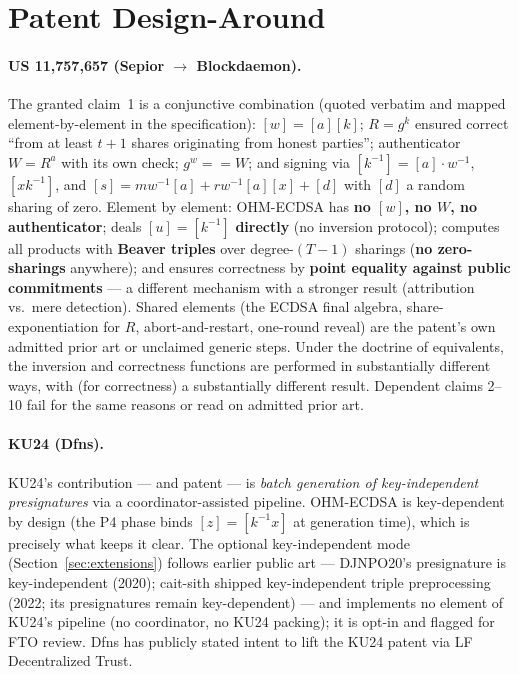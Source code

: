 \documentclass[11pt]{article}
\theoremstyle{plain}
\theoremstyle{definition}
\theoremstyle{remark}
\newcommand{\share}[1]{[#1]}
\begin{document}
\section{Patent Design-Around}\label{sec:patent}

\paragraph{US 11,757,657 (Sepior $\to$ Blockdaemon).} The granted claim~1 is a conjunctive combination (quoted verbatim and mapped element-by-element in the specification): $\share{w} = \share{a}\share{k}$; $R = g^k$ ensured correct ``from at least $t{+}1$ shares originating from honest parties''; authenticator $W = R^a$ with its own check; $g^w == W$; and signing via $\share{k^{-1}} = \share{a}\cdot w^{-1}$, $\share{x k^{-1}}$, and $\share{s} = m w^{-1}\share{a} + r w^{-1}\share{a}\share{x} + \share{d}$ with $\share{d}$ a random sharing of zero. Element by element: OHM-ECDSA has \textbf{no $\share{w}$, no $W$, no authenticator}; deals $\share{u} = \share{k^{-1}}$ \textbf{directly} (no inversion protocol); computes all products with \textbf{Beaver triples} over degree-$(T{-}1)$ sharings (\textbf{no zero-sharings} anywhere); and ensures correctness by \textbf{point equality against public commitments} --- a different mechanism with a stronger result (attribution vs.\ mere detection). Shared elements (the ECDSA final algebra, share-exponentiation for $R$, abort-and-restart, one-round reveal) are the patent's own admitted prior art or unclaimed generic steps. Under the doctrine of equivalents, the inversion and correctness functions are performed in substantially different ways, with (for correctness) a substantially different result. Dependent claims 2--10 fail for the same reasons or read on admitted prior art.

\paragraph{KU24 (Dfns).} KU24's contribution --- and patent --- is \emph{batch generation of key-independent presignatures} via a coordinator-assisted pipeline. OHM-ECDSA is key-dependent by design (the P4 phase binds $\share{z} = \share{k^{-1}x}$ at generation time), which is precisely what keeps it clear. The optional key-independent mode (Section~\ref{sec:extensions}) follows earlier public art --- DJNPO20's presignature is key-independent (2020); cait-sith shipped key-independent triple preprocessing (2022; its presignatures remain key-dependent) --- and implements no element of KU24's pipeline (no coordinator, no KU24 packing); it is opt-in and flagged for FTO review. Dfns has publicly stated intent to lift the KU24 patent via LF Decentralized Trust.
\end{document}

